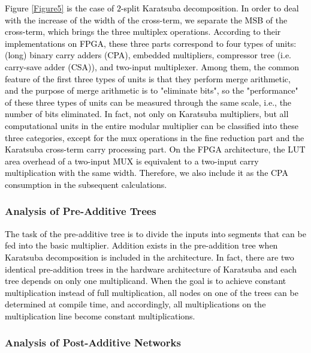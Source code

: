 \documentclass[conference]{IEEEtran}
\begin{document}
\textcolor{black}{
Figure \ref{Figure5} is the case of $2$-split Karatsuba decomposition. In order to deal with the increase of the width of the cross-term, we separate the MSB of the cross-term, which brings the three multiplex operations.}
\textcolor{black}{
According to their implementations on FPGA, these three parts correspond to four types of units: (long) binary carry adders (CPA), embedded multipliers, compressor tree (i.e. carry-save adder (CSA)), and two-input multiplexer. Among them, the common feature of the first three types of units is that they perform merge arithmetic, and the purpose of merge arithmetic is to "eliminate bits", so the "performance" of these three types of units can be measured through the same scale, i.e., the number of bits eliminated. In fact, not only on Karatsuba multipliers, but all computational units in the entire modular multiplier can be classified into these three categories, except for the mux operations in the fine reduction part and the Karatsuba cross-term carry processing part. On the FPGA architecture, the LUT area overhead of a two-input MUX is equivalent to a two-input carry multiplication with the same width. Therefore, we also include it as the CPA consumption in the subsequent calculations.
}


\subsubsection{Analysis of Pre-Additive Trees}    %

\textcolor{black}{
The task of the pre-additive tree is to divide the inputs into segments that can be fed into the basic multiplier. Addition exists in the pre-addition tree when Karatsuba decomposition is included in the architecture. In fact, there are two identical pre-addition trees in the hardware architecture of Karatsuba and each tree depends on only one multiplicand. When the goal is to achieve constant multiplication instead of full multiplication, all nodes on one of the trees can be determined at compile time, and accordingly, all multiplications on the multiplication line become constant multiplications.
}

\subsubsection{Analysis of Post-Additive Networks}    %
\end{document}
